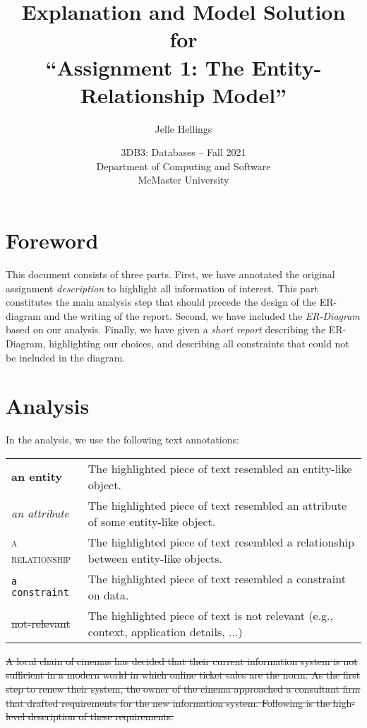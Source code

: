 \documentclass{article}
\author{Jelle Hellings}
\date{
    3DB3: Databases -- Fall 2021\\[0.5cm]
    Department of Computing and Software\\
    McMaster University
}
\newcommand{\ENT}[1]{\textcolor{colA}{\textbf{#1}}}
\newcommand{\AT}[1]{\textcolor{colB}{\textit{#1}}}
\newcommand{\RS}[1]{\textcolor{colC}{\textsc{#1}}}
\newcommand{\CON}[1]{\textcolor{colG}{\texttt{#1}}}
\newcommand{\IR}[1]{\textcolor{black!50}{\sout{#1}}}
\begin{document}
\title{Explanation and Model Solution for\\``Assignment 1: The Entity-Relationship Model''}
\maketitle

\section*{Foreword}

This document consists of three parts. First, we have annotated the original assignment \emph{description} to highlight all information of interest. This part constitutes the main analysis step that should precede the design of the ER-diagram and the writing of the report. Second, we have included the \emph{ER-Diagram} based on our analysis. Finally, we have given a \emph{short report} describing the ER-Diagram, highlighting our choices, and describing all constraints that could not be included in the diagram.

\section*{Analysis}

In the analysis, we use the following text annotations:
\begin{center}
\begin{tabular}{lp{12cm}}
\ENT{an entity}&The highlighted piece of text resembled an entity-like object.\\
\AT{an attribute}& The highlighted piece of text resembled an attribute of some entity-like object.\\
\RS{a relationship}& The highlighted piece of text resembled a relationship between entity-like objects.\\
\CON{a constraint}& The highlighted piece of text resembled a constraint on data.\\
\IR{not-relevant}&The highlighted piece of text is not relevant (e.g., context, application details, ...)\\
\end{tabular}
\end{center}

\IR{A local chain of cinemas has decided that their current information system is not sufficient in a modern world in which online ticket sales are the norm. As the first step to renew their system, the owner of the cinema approached a consultant firm that drafted requirements for the new information system. Following is the high-level description of these requirements.}
\end{document}
